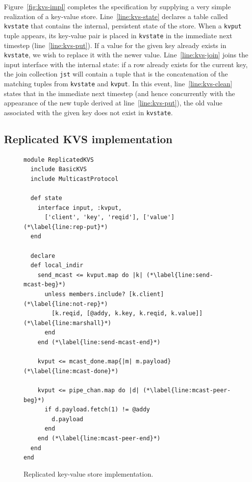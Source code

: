 Figure~\ref{fig:kvs-impl} completes the specification by supplying a very simple
realization of a key-value store.  Line~\ref{line:kvs-state} declares a table
called \texttt{kvstate} that contains the internal, persistent state of the
store.  When a \texttt{kvput} tuple appears, its key-value pair is placed in
\texttt{kvstate} in the immediate next timestep (line~\ref{line:kvs-put}).  If
a value for the given key already exists in \texttt{kvstate}, we wish to
replace it with the newer value.  Line~\ref{line:kvs-join} joins the input
interface with the internal state: if a row already exists for the current key,
the join collection \texttt{jst} will contain a tuple that is the concatenation
of the matching tuples from \texttt{kvstate} and \texttt{kvput}.  In this
event, line~\ref{line:kvs-clean} states that in the immediate next timestep (and
hence concurrently with the appearance of the new tuple derived at
line~\ref{line:kvs-put}), the old value associated with the given key does not
exist in \texttt{kvstate}.


\subsection{Replicated KVS implementation}
\label{sec:rep-kvs}

\begin{figure}[t]
\begin{scriptsize}
\begin{lstlisting}
module ReplicatedKVS
  include BasicKVS
  include MulticastProtocol

  def state
    interface input, :kvput, 
      ['client', 'key', 'reqid'], ['value']  (*\label{line:rep-put}*)
  end

  declare
  def local_indir
    send_mcast <= kvput.map do |k| (*\label{line:send-mcast-beg}*)
      unless members.include? [k.client]  (*\label{line:not-rep}*)
        [k.reqid, [@addy, k.key, k.reqid, k.value]]   (*\label{line:marshall}*)            
      end
    end (*\label{line:send-mcast-end}*)
    
    kvput <= mcast_done.map{|m| m.payload}  (*\label{line:mcast-done}*)

    kvput <= pipe_chan.map do |d| (*\label{line:mcast-peer-beg}*)
      if d.payload.fetch(1) != @addy
        d.payload
      end
    end (*\label{line:mcast-peer-end}*)
  end
end
\end{lstlisting}
\vspace{-10pt}
\caption{Replicated key-value store implementation.}
\label{fig:kvs-repl}
\end{scriptsize}
\vspace{-2pt}
\end{figure}


